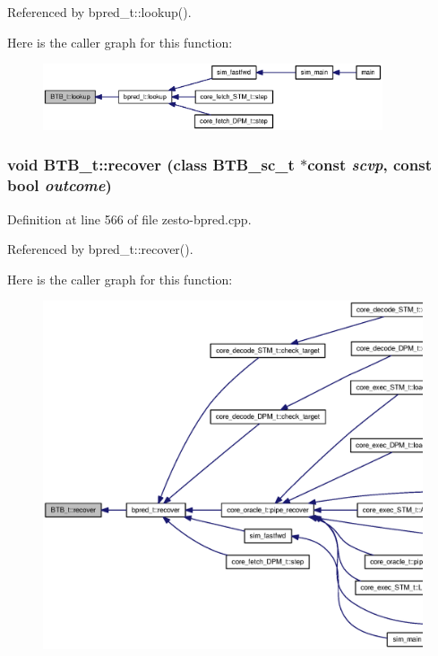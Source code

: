 Referenced by bpred\_\-t::lookup().

Here is the caller graph for this function:\nopagebreak
\begin{figure}[H]
\begin{center}
\leavevmode
\includegraphics[width=284pt]{classBTB__t_1bf028f9f8cf5dd78a0590ebcef73b80_icgraph}
\end{center}
\end{figure}
\subsubsection[{recover}]{\setlength{\rightskip}{0pt plus 5cm}void BTB\_\-t::recover (class {\bf BTB\_\-sc\_\-t} $\ast$const  {\em scvp}, \/  const bool {\em outcome})\hspace{0.3cm}{\tt  [virtual]}}\label{classBTB__t_120f5d41cf791935150de6ec051ea560}




Definition at line 566 of file zesto-bpred.cpp.

Referenced by bpred\_\-t::recover().

Here is the caller graph for this function:\nopagebreak
\begin{figure}[H]
\begin{center}
\leavevmode
\includegraphics[width=420pt]{classBTB__t_120f5d41cf791935150de6ec051ea560_icgraph}
\end{center}
\end{figure}
